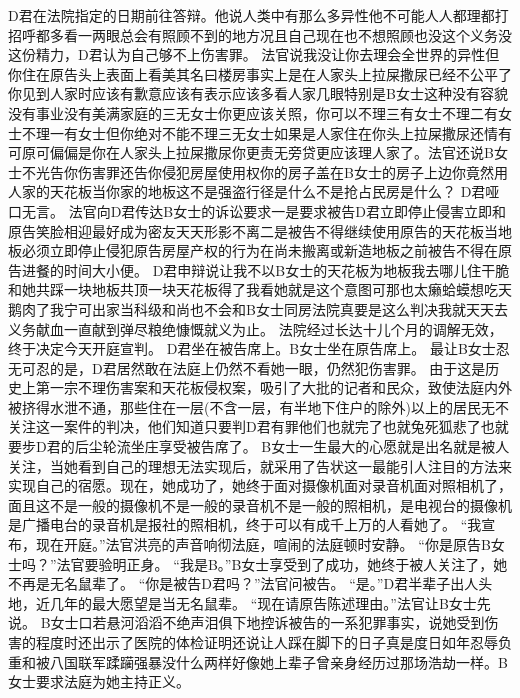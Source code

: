 \documentclass[a4paper,12pt,UTF8,twoside]{ctexbook}
\begin{document}
        D君在法院指定的日期前往答辩。他说人类中有那么多异性他不可能人人都理都打招呼都多看一两眼总会有照顾不到的地方况且自己现在也不想照顾也没这个义务没这份精力，D君认为自己够不上伤害罪。  
        法官说我没让你去理会全世界的异性但你住在原告头上表面上看美其名曰楼房事实上是在人家头上拉屎撒尿已经不公平了你见到人家时应该有歉意应该有表示应该多看人家几眼特别是B女士这种没有容貌没有事业没有美满家庭的三无女士你更应该关照，你可以不理三有女士不理二有女士不理一有女士但你绝对不能不理三无女士如果是人家住在你头上拉屎撒尿还情有可原可偏偏是你在人家头上拉屎撒尿你更责无旁贷更应该理人家了。法官还说B女士不光告你伤害罪还告你侵犯房屋使用权你的房子盖在B女士的房子上边你竟然用人家的天花板当你家的地板这不是强盗行径是什么不是抢占民房是什么？  
        D君哑口无言。  
        法官向D君传达B女士的诉讼要求一是要求被告D君立即停止侵害立即和原告笑脸相迎最好成为密友天天形影不离二是被告不得继续使用原告的天花板当地板必须立即停止侵犯原告房屋产权的行为在尚未搬离或新造地板之前被告不得在原告进餐的时间大小便。  
        D君申辩说让我不以B女士的天花板为地板我去哪儿住干脆和她共踩一块地板共顶一块天花板得了我看她就是这个意图可那也太癞蛤蟆想吃天鹅肉了我宁可出家当科级和尚也不会和B女士同房法院真要是这么判决我就天天去义务献血一直献到弹尽粮绝慷慨就义为止。  
        法院经过长达十儿个月的调解无效，终于决定今天开庭宣判。  
        D君坐在被告席上。B女士坐在原告席上。  
        最让B女士忍无可忍的是，D君居然敢在法庭上仍然不看她一眼，仍然犯伤害罪。  
        由于这是历史上第一宗不理伤害案和天花板侵权案，吸引了大批的记者和民众，致使法庭内外被挤得水泄不通，那些住在一层(不含一层，有半地下住户的除外)以上的居民无不关注这一案件的判决，他们知道只要判D君有罪他们也就完了也就兔死狐悲了也就要步D君的后尘轮流坐庄享受被告席了。  
        B女士一生最大的心愿就是出名就是被人关注，当她看到自己的理想无法实现后，就采用了告状这一最能引人注目的方法来实现自己的宿愿。现在，她成功了，她终于面对摄像机面对录音机面对照相机了，面且这不是一般的摄像机不是一般的录音机不是一般的照相机，是电视台的摄像机是广播电台的录音机是报社的照相机，终于可以有成千上万的人看她了。  
        “我宣布，现在开庭。”法官洪亮的声音响彻法庭，喧闹的法庭顿时安静。  
        “你是原告B女士吗？”法官要验明正身。  
        “我是B。”B女士享受到了成功，她终于被人关注了，她不再是无名鼠辈了。  
        “你是被告D君吗？”法官问被告。  
        “是。”D君半辈子出人头地，近几年的最大愿望是当无名鼠辈。  
        “现在请原告陈述理由。”法官让B女士先说。  
        B女士口若悬河滔滔不绝声泪俱下地控诉被告的一系犯罪事实，说她受到伤害的程度时还出示了医院的体检证明还说让人踩在脚下的日子真是度日如年忍辱负重和被八国联军蹂躏强暴没什么两样好像她上辈子曾亲身经历过那场浩劫一样。B女士要求法庭为她主持正义。  
\end{document}
